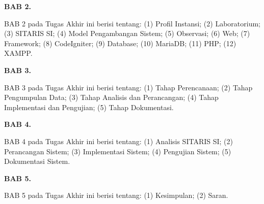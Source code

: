 \textbf{BAB 2. \babDua}

BAB 2 pada Tugas Akhir ini berisi tentang: (1) Profil Instansi; (2) Laboratorium; (3) SITARIS SI; (4) Model Pengambangan Sistem; (5) Observasi; (6) Web; (7) Framework; (8) CodeIgniter; (9) Database; (10) MariaDB; (11) PHP; (12) XAMPP.

\textbf{BAB 3. \babTiga}

BAB 3 pada Tugas Akhir ini berisi tentang: (1) Tahap Perencanaan; (2) Tahap Pengumpulan Data; (3) Tahap Analisis dan Perancangan; (4) Tahap Implementasi dan Pengujian; (5) Tahap Dokumentasi.

\textbf{BAB 4. \babEmpat}

BAB 4 pada Tugas Akhir ini berisi tentang: (1) Analisis SITARIS SI; (2) Perancangan Sistem; (3) Implementasi Sistem; (4) Pengujian Sistem; (5) Dokumentasi Sistem.

\textbf{BAB 5. \babLima}

BAB 5 pada Tugas Akhir ini berisi tentang: (1) Kesimpulan; (2) Saran.
